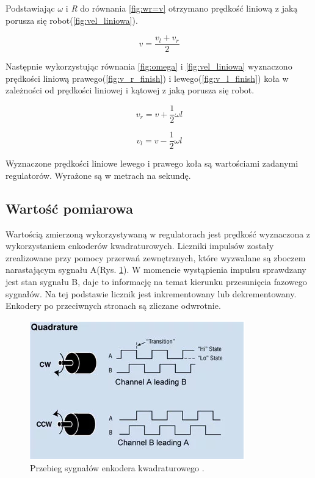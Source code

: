 Podstawiając \textit{$\omega$} i \textit{R} do równania \ref{fig:wr=v} otrzymano prędkość liniową z jaką porusza się robot(\ref{fig:vel_liniowa}).

\begin{equation}
v = \frac{v_l+v_r}{2}
\label{fig:vel_liniowa}
\end{equation}

Następnie wykorzystując równania \ref{fig:omega} i \ref{fig:vel_liniowa} wyznaczono prędkości liniową  prawego(\ref{fig:v_r_finish}) i lewego(\ref{fig:v_l_finish}) koła w zależności od prędkości liniowej i kątowej z jaką porusza się robot.

\begin{equation}
v_r = v + \frac{1}{2}\omega l
\label{fig:v_r_finish}
\end{equation}

\begin{equation}
v_l = v - \frac{1}{2}\omega l
\label{fig:v_l_finish}
\end{equation}

Wyznaczone prędkości liniowe lewego i prawego koła  są wartościami zadanymi regulatorów. Wyrażone są w metrach na sekundę.
\subsection{Wartość pomiarowa}

Wartością zmierzoną wykorzystywaną w regulatorach jest prędkość wyznaczona z wykorzystaniem enkoderów kwadraturowych. Liczniki impulsów zostały zrealizowane przy pomocy przerwań zewnętrznych, które wyzwalane są zboczem narastającym sygnału A(Rys. \ref{fig:encoder_quad}). W momencie wystąpienia impulsu sprawdzany jest stan sygnału B, daje to informację na temat kierunku przesunięcia fazowego sygnałów. Na tej podstawie licznik jest inkrementowany lub dekrementowany.  Enkodery po przeciwnych stronach są zliczane odwrotnie.
\begin{figure}[!h]
	\centering
	\includegraphics[scale=1]{enkodery.png}
	\caption{Przebieg sygnałów enkodera kwadraturowego \cite{encoder_quad}.}
	\label{fig:encoder_quad}
\end{figure}

